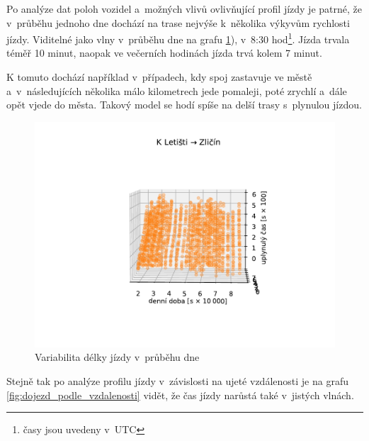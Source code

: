 Po analýze dat poloh vozidel a~možných vlivů ovlivňující profil jízdy je patrné, že v~průběhu jednoho dne dochází na trase nejvýše k~několika výkyvům rychlosti jízdy. Viditelné jako vlny v~průběhu dne na grafu \ref{fig:dojezd_ve_fazich_dne}), v~8:30 hod\footnote{časy jsou uvedeny v~UTC}. Jízda trvala téměř 10 minut, naopak ve večerních hodinách jízda trvá kolem 7 minut.


\bigbreak

K tomuto dochází například v~případech, kdy spoj zastavuje ve městě a~v~následujících několika málo kilometrech jede pomaleji, poté zrychlí a~dále opět vjede do města. Takový model se hodí spíše na delší trasy s~plynulou jízdou.


\begin{figure}
\centering
  \includegraphics[width=\linewidth]{../img/dojezd_ve_fazich_dne}
  \caption{Variabilita délky jízdy v~průběhu dne}
  \label{fig:dojezd_ve_fazich_dne}
\end{figure}


Stejně tak po analýze profilu jízdy v~závislosti na ujeté vzdálenosti je na grafu \ref{fig:dojezd_podle_vzdalenosti} vidět, že čas jízdy narůstá také v~jistých vlnách.


